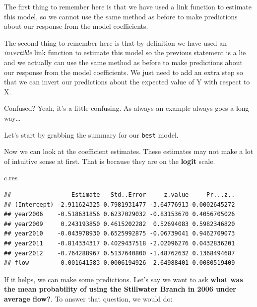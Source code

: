 \documentclass[
]{book}
\newenvironment{Shaded}{\begin{snugshade}}{\end{snugshade}}
\newcommand{\KeywordTok}[1]{\textcolor[rgb]{0.13,0.29,0.53}{\textbf{#1}}}
\newcommand{\NormalTok}[1]{#1}
\newcommand{\OperatorTok}[1]{\textcolor[rgb]{0.81,0.36,0.00}{\textbf{#1}}}
\newcommand{\StringTok}[1]{\textcolor[rgb]{0.31,0.60,0.02}{#1}}
\begin{document}
The first thing to remember here is that we have used a link function to estimate this model, so we cannot use the same method as before to make predictions about our response from the model coefficients.

The second thing to remember here is that by definition we have used an \emph{invertible} link function to estimate this model so the previous statement is a lie and we actually can use the same method as before to make predictions about our response from the model coefficients. We just need to add an extra step so that we can invert our predictions about the expected value of Y with respect to X.

Confused? Yeah, it's a little confusing. As always an example always goes a long way\ldots{}

Let's start by grabbing the summary for our \texttt{best} model.

\begin{Shaded}
\end{Shaded}

Now we can look at the coefficient estimates. These estimates may not make a lot of intuitive sense at first. That is because they are on the \textbf{logit} scale.

\begin{Shaded}
\begin{Highlighting}[]
\NormalTok{c.res}
\end{Highlighting}
\end{Shaded}

\begin{verbatim}
##                 Estimate   Std..Error     z.value     Pr...z..
## (Intercept) -2.911624325 0.7981931477 -3.64776913 0.0002645272
## year2006    -0.518631856 0.6237029032 -0.83153670 0.4056705026
## year2009     0.243193850 0.4615202282  0.52694083 0.5982346820
## year2010    -0.043978930 0.6525992875 -0.06739041 0.9462709073
## year2011    -0.814334317 0.4029437518 -2.02096276 0.0432836201
## year2012    -0.764288967 0.5137640800 -1.48762632 0.1368494687
## flow         0.001641583 0.0006194926  2.64988401 0.0080519409
\end{verbatim}

If it helps, we can make some predictions. Let's say we want to ask \textbf{what was the mean probability of using the Stillwater Branch in 2006 under average flow?}. To answer that question, we would do:
\end{document}

